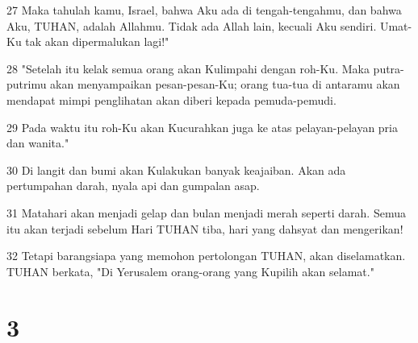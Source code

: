 \par 27 Maka tahulah kamu, Israel, bahwa Aku ada di tengah-tengahmu, dan bahwa Aku, TUHAN, adalah Allahmu. Tidak ada Allah lain, kecuali Aku sendiri. Umat-Ku tak akan dipermalukan lagi!"
\par 28 "Setelah itu kelak semua orang akan Kulimpahi dengan roh-Ku. Maka putra-putrimu akan menyampaikan pesan-pesan-Ku; orang tua-tua di antaramu akan mendapat mimpi penglihatan akan diberi kepada pemuda-pemudi.
\par 29 Pada waktu itu roh-Ku akan Kucurahkan juga ke atas pelayan-pelayan pria dan wanita."
\par 30 Di langit dan bumi akan Kulakukan banyak keajaiban. Akan ada pertumpahan darah, nyala api dan gumpalan asap.
\par 31 Matahari akan menjadi gelap dan bulan menjadi merah seperti darah. Semua itu akan terjadi sebelum Hari TUHAN tiba, hari yang dahsyat dan mengerikan!
\par 32 Tetapi barangsiapa yang memohon pertolongan TUHAN, akan diselamatkan. TUHAN berkata, "Di Yerusalem orang-orang yang Kupilih akan selamat."

\chapter{3}

